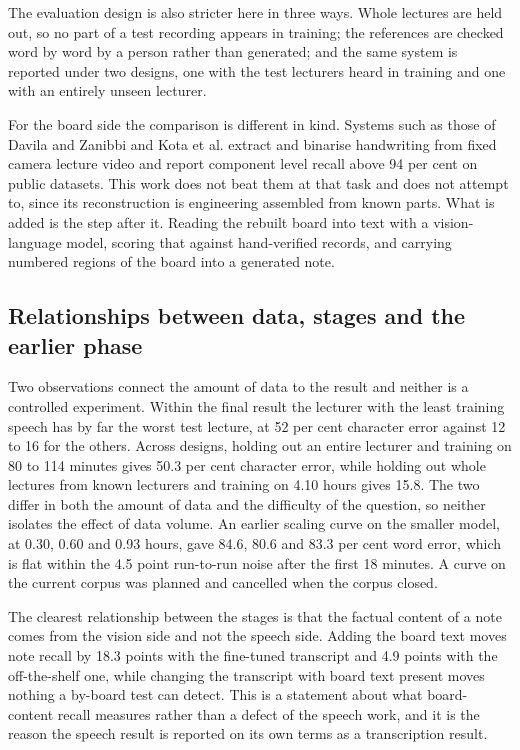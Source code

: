 The evaluation design is also stricter here in three ways. Whole lectures are held out, so
no part of a test recording appears in training; the references are checked word by word
by a person rather than generated; and the same system is reported under two designs, one
with the test lecturers heard in training and one with an entirely unseen lecturer.

For the board side the comparison is different in kind. Systems such as those of Davila
and Zanibbi \cite{davila2017whiteboard} and Kota et al. \cite{kota2019generalized} extract
and binarise handwriting from fixed camera lecture video and report component level recall
above 94 per cent on public datasets. This work does not beat them at that task and does
not attempt to, since its reconstruction is engineering assembled from known parts. What
is added is the step after it. Reading the rebuilt board into text with a vision-language
model, scoring that against hand-verified records, and carrying numbered regions of the
board into a generated note.

\subsection{Relationships between data, stages and the earlier phase}

Two observations connect the amount of data to the result and neither is a controlled
experiment. Within the final result the lecturer with the least training speech has by far
the worst test lecture, at 52 per cent character error against 12 to 16 for the others.
Across designs, holding out an entire lecturer and training on 80 to 114 minutes gives
50.3 per cent character error, while holding out whole lectures from known lecturers and
training on 4.10 hours gives 15.8. The two differ in both the amount of data and the
difficulty of the question, so neither isolates the effect of data volume. An earlier
scaling curve on the smaller model, at 0.30, 0.60 and 0.93 hours, gave 84.6, 80.6 and 83.3
per cent word error, which is flat within the 4.5 point run-to-run noise after the first
18 minutes. A curve on the current corpus was planned and cancelled when the corpus
closed.

The clearest relationship between the stages is that the factual content of a note comes
from the vision side and not the speech side. Adding the board text moves note recall
by 18.3 points with the fine-tuned transcript and 4.9 points with the off-the-shelf one,
while changing the transcript with board text present moves nothing a by-board test can
detect. This is a statement about what board-content recall measures rather than a defect
of the speech work, and it is the reason the speech result is reported on its own terms as
a transcription result.

